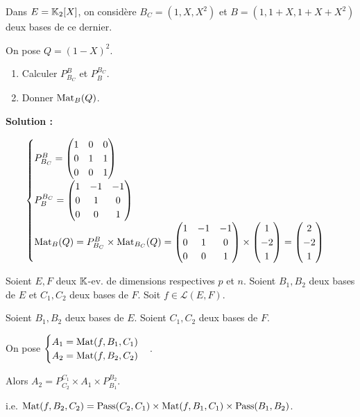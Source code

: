 \documentclass[12pt, a4paper]{report}
\begin{document}
\begin{example}
    Dans $E = \mathbb{K}_2[X]$, on considère $B_C = (1,X,X^2)$ et $B = (1,1+X,1+X+X^2)$ deux bases de ce dernier.

    On pose $Q = (1-X)^2$.
    \begin{enumerate}
        \item Calculer $P_{B_C}^B$ et $P_B^{B_C}$.
        \item Donner $\mathrm{Mat}_B(Q)$.
    \end{enumerate}

    \textbf{Solution :}

    $$\begin{cases}
    P_{B_C}^B = \left(\begin{matrix} 1 & 0 & 0 \\ 0 & 1 & 1 \\ 0 & 0 & 1 \end{matrix}\right)\\
    P_B^{B_C} = \left(\begin{matrix} 1 & -1 & -1 \\ 0 & 1 & 0 \\ 0 & 0 & 1 \end{matrix}\right)\\
    \mathrm{Mat}_B(Q) = P_{B_C}^{B} \times \mathrm{Mat}_{B_C}(Q) = \left(\begin{matrix} 1 & -1 & -1 \\ 0 & 1 & 0 \\ 0 & 0 & 1 \end{matrix}\right) \times \left(\begin{matrix} 1 \\ -2 \\ 1 \end{matrix}\right) = \left(\begin{matrix} 2 \\ -2 \\ 1 \end{matrix}\right)
    \end{cases}$$
\end{example}

\begin{property}
    Soient $E,F$ deux $\mathbb{K}$-ev. de dimensions respectives $p$ et $n$. Soient $B_1, B_2$ deux bases de $E$ et $C_1, C_2$ deux bases de $F$. Soit $f \in \mathcal L(E,F)$.

    Soient $B_1, B_2$ deux bases de $E$. Soient $C_1, C_2$ deux bases de $F$.

    On pose $\begin{cases} A_1 = \mathrm{Mat}(f,B_1,C_1) \\ A_2 = \mathrm{Mat}(f,B_2,C_2) \end{cases}$.

    Alors $A_2 = P_{C_2}^{C_1} \times A_1 \times P_{B_1}^{B_2}$.

    i.e. $\mathrm{Mat}(f,B_2,C_2) = \mathrm{Pass}(C_2,C_1) \times \mathrm{Mat}(f,B_1,C_1) \times \mathrm{Pass}(B_1,B_2)$.
\end{property}
\end{document}
